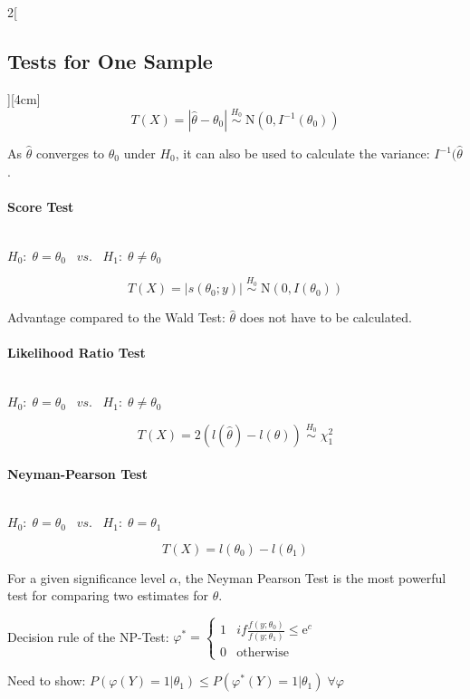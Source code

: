 \documentclass[8pt]{extarticle}
\begin{document}
\begin{multicols}{2}[\subsection{Tests for One Sample}][4cm]
  $$T(X) = |\hat{\theta} - \theta_0|\; \overset{H_0}{\sim}\; \mathrm{N}(0, I^{-1}(\theta_0))$$
  
  \noindent As $\hat{\theta}$ converges to $\theta_0$ under $H_0$, it can also be used to calculate the variance: $I^{-1}(\hat{\theta}$.
  
    \paragraph{Score Test} \ \\
  
  \noindent $H_0\!:\; \theta = \theta_0 \;\;\; vs. \;\;\; H_1\!:\; \theta \neq \theta_0$
  
  $$T(X) = |s(\theta_0;y)|\; \overset{H_0}{\sim}\; \mathrm{N}(0, I(\theta_0))$$
  
  \noindent Advantage compared to the Wald Test: $\hat{\theta}$ does not have to be calculated.
  
      \paragraph{Likelihood Ratio Test} \ \\
  
  \noindent $H_0\!:\; \theta = \theta_0 \;\;\; vs. \;\;\; H_1\!:\; \theta \neq \theta_0$
  
  $$T(X) = 2(l(\hat{\theta}) - l(\theta)) \; \overset{H_0}{\sim}\; \chi^2_1$$
  
      \paragraph{Neyman-Pearson Test} \ \\
  
  \noindent $H_0\!:\; \theta = \theta_0 \;\;\; vs. \;\;\; H_1\!:\; \theta = \theta_1$
  
  $$T(X) = l(\theta_0) - l(\theta_1)$$
  
  \noindent For a given significance level $\alpha$, the Neyman Pearson Test is the most powerful test for comparing two estimates for $\theta$.
  
\begin{Proof}
Decision rule of the NP-Test: $\varphi^* {=} \begin{cases} 1 & if \frac{f(y;\theta_0)}{f(y;\theta_1)} \leq \mathrm{e}^c\\ 0 & \text{otherwise} \end{cases}$

\noindent Need to show: $P(\varphi(Y) {=} 1|\theta_1) \leq P(\varphi^*(Y) {=} 1|\theta_1)\; \forall \varphi$ 


\end{Proof}
\end{multicols}
\end{document}
